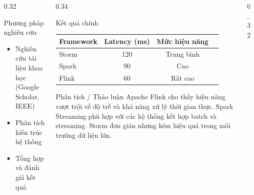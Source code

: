 \documentclass[final]{beamer}
\begin{document}
\begin{frame}[t]
\begin{columns}[t,totalwidth=\textwidth]
\begin{column}{0.32\textwidth}
\begin{block}{Phương pháp nghiên cứu}
\begin{itemize}
    \item Nghiên cứu tài liệu khoa học (Google Scholar, IEEE)
    \item Phân tích kiến trúc hệ thống
    \item Tổng hợp và đánh giá kết quả
\end{itemize}
\end{block}

\end{column}

\begin{column}{0.34\textwidth}

\begin{block}{Kết quả chính}
\centering
{}

\vspace{0.5cm}

\begin{tabular}{lccc}
\toprule
\textbf{Framework} & \textbf{Latency (ms)} & \textbf{Mức hiệu năng} \\
\midrule
Storm & 120 & Trung bình \\
Spark & 90 & Cao \\
Flink & 60 & Rất cao \\
\bottomrule
\end{tabular}
\end{block}

\begin{block}{Phân tích / Thảo luận}
Apache Flink cho thấy hiệu năng vượt trội về độ trễ và khả năng xử lý thời gian thực.
Spark Streaming phù hợp với các hệ thống kết hợp batch và streaming.
Storm đơn giản nhưng kém hiệu quả trong môi trường dữ liệu lớn.
\end{block}

\end{column}

\begin{column}{0.32\textwidth}


\end{column}
\end{columns}
\end{frame}
\end{document}
